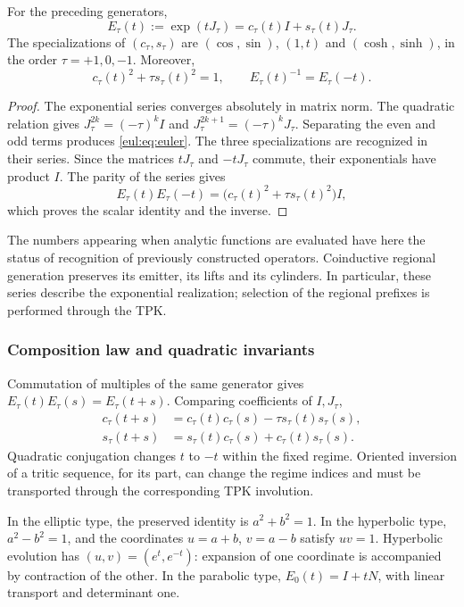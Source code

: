 \begin{teorema}
\label{eul:teo:euler}
For the preceding generators,
\begin{equation}
 E_\tau(t):=\exp(tJ_\tau)
 =c_\tau(t)I+s_\tau(t)J_\tau.
\label{eul:eq:euler}
\end{equation}
The specializations of \((c_\tau,s_\tau)\) are
\((\cos,\sin)\), \((1,t)\) and \((\cosh,\sinh)\), in the order
\(\tau=+1,0,-1\). Moreover,
\[
 c_\tau(t)^2+\tau s_\tau(t)^2=1,
 \qquad E_\tau(t)^{-1}=E_\tau(-t).
\]
\end{teorema}
\begin{proof}
The exponential series converges absolutely in matrix norm.
The quadratic relation gives
\(J_\tau^{2k}=(-\tau)^kI\) and
\(J_\tau^{2k+1}=(-\tau)^kJ_\tau\). Separating the even and odd
terms produces \eqref{eul:eq:euler}. The three specializations are
recognized in their series. Since the matrices \(tJ_\tau\) and \(-tJ_\tau\)
commute, their exponentials have product \(I\). The parity of the
series gives
\[
 E_\tau(t)E_\tau(-t)
 =\bigl(c_\tau(t)^2+\tau s_\tau(t)^2\bigr)I,
\]
which proves the scalar identity and the inverse.
\end{proof}

The numbers appearing when analytic functions are evaluated have here
the status of recognition of previously constructed operators.
Coinductive regional generation preserves its emitter, its lifts
and its cylinders. In particular, these series describe the exponential
realization; selection of the regional prefixes is performed through
the TPK.

\subsubsection{Composition law and quadratic invariants}

Commutation of multiples of the same generator gives
\(E_\tau(t)E_\tau(s)=E_\tau(t+s)\). Comparing coefficients of
\(I,J_\tau\),
\begin{align}
 c_\tau(t+s)&=c_\tau(t)c_\tau(s)-\tau s_\tau(t)s_\tau(s),\\
 s_\tau(t+s)&=s_\tau(t)c_\tau(s)+c_\tau(t)s_\tau(s).
\end{align}
Quadratic conjugation changes \(t\) to \(-t\) within the fixed
regime. Oriented inversion of a tritic sequence, for its part,
can change the regime indices and must be transported through the
corresponding TPK involution.

In the elliptic type, the preserved identity is \(a^2+b^2=1\).
In the hyperbolic type, \(a^2-b^2=1\), and the coordinates \(u=a+b\),
\(v=a-b\) satisfy \(uv=1\). Hyperbolic evolution has
\((u,v)=(e^t,e^{-t})\): expansion of one coordinate is accompanied
by contraction of the other. In the parabolic type,
\(E_0(t)=I+tN\), with linear transport and determinant one.

